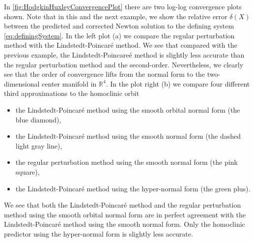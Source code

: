 In \cref{fig:HodgkinHuxleyConvergencePlot} there are two log-log convergence
plots shown. Note that in this and the next example, we show the relative error
$\delta(X)$ between the predicted and corrected Newton solution to the defining
system \cref{eq:definingSystem}.  In the left plot (a) we compare the regular
perturbation method with the Lindstedt-Poincar\'e method. We see that compared
with the previous example, the Lindstedt-Poincare\'e method is slightly less
accurate than the regular perturbation method and the second-order.
Nevertheless, we clearly see that the order of convergence lifts from the
normal form to the two-dimensional center manifold in $\mathbb R^4$. In the
plot right (b) we compare four different third approximations to the homoclinic
orbit
\begin{itemize}
    \item the Lindstedt-Poincar\'e method using the smooth orbital normal form
        (the blue diamond),
    \item the Lindstedt-Poincar\'e method using the smooth normal form
        (the dashed light gray line),
    \item the regular perturbation method using the smooth normal form
        (the pink square), 
    \item the Lindstedt-Poincar\'e method using the hyper-normal form
        (the green plus).
\end{itemize}

We see that both the Lindstedt-Poincar\'e method and the regular perturbation
method using the smooth orbital normal form are in perfect agreement with the
Lindstedt-Poincar\'e method using the smooth normal form. Only the homoclinic
predictor using the hyper-normal form is slightly less accurate.
\fi

